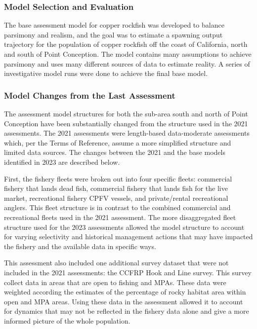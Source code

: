 \documentclass[11pt,
  english,
  letterpaper,
]{article}
\begin{document}
\hypertarget{model-selection-and-evaluation}{%
\subsubsection{Model Selection and Evaluation}\label{model-selection-and-evaluation}}

The base assessment model for copper rockfish was developed to balance parsimony and realism, and the goal was to estimate a spawning output trajectory for the population of copper rockfish off the coast of California, north and south of Point Conception. The model contains many assumptions to achieve parsimony and uses many different sources of data to estimate reality. A series of investigative model runs were done to achieve the final base model.

\hypertarget{model-changes-from-the-last-assessment}{%
\subsubsection{Model Changes from the Last Assessment}\label{model-changes-from-the-last-assessment}}

The assessment model structures for both the sub-area south and north of Point Conception have been substantially changed from the structure used in the 2021 assessments. The 2021 assessments were length-based data-moderate assessments which, per the Terms of Reference, assume a more simplified structure and limited data sources. The changes between the 2021 and the base models identified in 2023 are described below.

First, the fishery fleets were broken out into four specific fleets: commercial fishery that lands dead fish, commercial fishery that lands fish for the live market, recreational fishery CPFV vessels, and private/rental recreational anglers. This fleet structure is in contrast to the combined commercial and recreational fleets used in the 2021 assessment. The more disaggregated fleet structure used for the 2023 assessments allowed the model structure to account for varying selectivity and historical management actions that may have impacted the fishery and the available data in specific ways.

This assessment also included one additional survey dataset that were not included in the 2021 assessments: the CCFRP Hook and Line survey. This survey collect data in areas that are open to fishing and MPAs. These data were weighted according the estimates of the percentage of rocky habitat area within open and MPA areas. Using these data in the assessment allowed it to account for dynamics that may not be reflected in the fishery data alone and give a more informed picture of the whole population.
\end{document}
